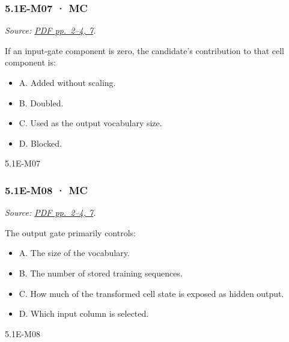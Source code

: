 \noindent\begin{minipage}{\linewidth}

\subsubsection{5.1E-M07 · MC}\label{e-m07-mc}

\emph{Source:
\href{../Lecture\%20Slides/5.1.\%20Extra\%20Material.pdf\#page=2}{PDF
pp.~2--4, 7}.}

If an input-gate component is zero, the candidate's contribution to that
cell component is:

\begin{itemize}
\tightlist
\item
  A. Added without scaling.
\item
  B. Doubled.
\item
  C. Used as the output vocabulary size.
\item
  D. Blocked.
\end{itemize}

\begin{solution}[8mm]{5.1E-M07}

\end{solution}
\end{minipage}\par\medskip

\noindent\begin{minipage}{\linewidth}

\subsubsection{5.1E-M08 · MC}\label{e-m08-mc}

\emph{Source:
\href{../Lecture\%20Slides/5.1.\%20Extra\%20Material.pdf\#page=2}{PDF
pp.~2--4, 7}.}

The output gate primarily controls:

\begin{itemize}
\tightlist
\item
  A. The size of the vocabulary.
\item
  B. The number of stored training sequences.
\item
  C. How much of the transformed cell state is exposed as hidden output.
\item
  D. Which input column is selected.
\end{itemize}

\begin{solution}[8mm]{5.1E-M08}

\end{solution}
\end{minipage}\par\medskip

